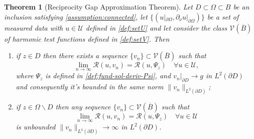 \documentclass[10pt, a4paper, twoside, openright]{book}
\theoremstyle{definition}
\theoremstyle{plain}
\newtheorem{theorem}[subsection]{Theorem}
\theoremstyle{plain}
\theoremstyle{plain}
\theoremstyle{plain}
\theoremstyle{plain}
\theoremstyle{plain}
\theoremstyle{plain}
\theoremstyle{plain}
\begin{document}
\begin{theorem}[Reciprocity Gap Approximation Theorem]
 \label{theo:approximation-rg} 
 Let $D\subset\Omega\subset B$  be an inclusion satisfying \ref{assumption:connected}, let $\{(u|_{\partial \Omega},\partial_\nu u|_{\partial \Omega})\}$ 
 be a set of measured data with $u\in\mathcal{U}$ defined in \ref{def:setU} and 
 let consider the class $\mathcal{V}(\overline{B})$ of harmonic test functions 
 defined in \ref{def:setV}. Then
 \begin{enumerate}
  \item if $z \in D$ then there exists a sequence $\{v_n\} \subset \mathcal{V}(\overline{B})$ such that
   \begin{equation}
     \lim_{n\to\infty}\mathcal{R}(u,v_n) = \mathcal{R}(u,\Psi_z)\quad\forall u\in\mathcal{U},\label{eq:rg-lim-constructive}
   \end{equation}
   where $\Psi_z$ is defined in \ref{def:fund-sol-deriv-Psi}, and $v_n|_{\partial D}\to g$ in $L^2(\partial D)$ and consequently  it's bounded in the same norm $\|v_n\|_{L^2(\partial D)}$;
  \item if $z \in \Omega \backslash D$ then any sequence $\{v_n\} \subset \mathcal{V}(\overline{B})$ such that
   \begin{equation}
     \lim_{n\to\infty}\mathcal{R}(u,v_n) = \mathcal{R}(u,\Psi_z)\quad\forall u\in\mathcal{U}\label{eq:rg-lim-counterpart}
   \end{equation}
   is unbounded $\|v_n\|_{L^2(\partial D)}\to\infty$ in $L^2(\partial D)$.
 \end{enumerate}
\end{theorem}
\end{document}
